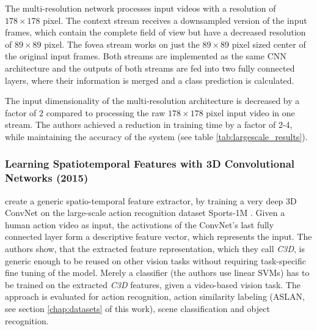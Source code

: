 The multi-resolution network processes input videos with a resolution of $178\times178$ pixel.
The context stream receives a downsampled version of the input frames, which contain the complete field of view but have a decreased resolution of $89\times89$ pixel.
The fovea stream works on just the $89\times89$ pixel sized center of the original input frames.
Both streams are implemented as the same CNN architecture and the outputs of both streams are fed into two fully connected layers, where their information is merged and a class prediction is calculated.

The input dimensionality of the multi-resolution architecture is decreased by a factor of $2$ compared to processing the raw $178\times178$ pixel input video in one stream.
The authors achieved a reduction in training time by a factor of 2-4, while maintaining the accuracy of the system (see table \ref{tab:largescale_results}).


\subsubsection{Learning Spatiotemporal Features with 3D Convolutional Networks (2015)}
\textcite{tran_learning_2015} create a generic spatio-temporal feature extractor, by training a very deep 3D ConvNet on the large-scale action recognition dataset Sports-1M \cite{karpathy_large-scale_2014}.
Given a human action video as input, the activations of the ConvNet's last fully connected layer form a descriptive feature vector, which represents the input.
The authors show, that the extracted feature representation, which they call \textit{C3D}, is generic enough to be reused on other vision tasks without requiring task-specific fine tuning of the model.
Merely a classifier (the authors use linear SVMs) has to be trained on the extracted \textit{C3D} features, given a video-based vision task.
The approach is evaluated for action recognition, action similarity labeling (ASLAN, see section \ref{chap:datasets} of this work), scene classification and object recognition.

